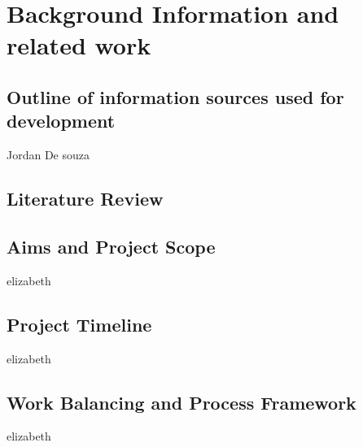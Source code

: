 \chapter{Background Information and related work}
\label{chapter2label}

\section{Outline of information sources used for development}
\label{outline_information_for_development}

Jordan De souza


\section{Literature Review}
\label{literature_review}








\section{Aims and Project Scope}
\label{aims_project_scope}

elizabeth

\section{Project Timeline}
\label{project_timeline}

elizabeth



\section{Work Balancing and Process Framework}

elizabeth




